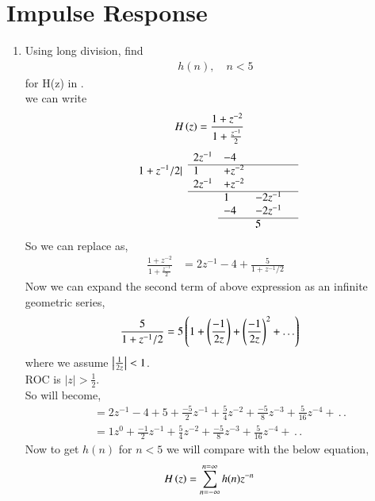 \documentclass[journal,12pt,twocolumn]{IEEEtran}
\renewcommand\thesection{\arabic{section}}
\begin{document}
\section{Impulse Response}
  \begin{enumerate}[label=\thesection.\arabic*]
    \item Using long division, 
find
		\begin{align}
			h(n), \quad n < 5
		\end{align}
		for H(z) in 
		.\\
    \solution  we can write
	  \begin{align}
		H\left(z\right) &= \frac{1 + z^{-2}}{1 + \frac{z^{-1}}{2}}
	  \end{align}
    $$
\begin{array}{llllll}
& 2z^{-1} & -4 \\\cline{2-5}
1 + z^{-1}/2 | & 1& +z^{-2}  \\
& 2z^{-1} & +z^{-2}  \\\cline{2-5}
& & 1 & -2z^{-1} \\
& & -4 & -2z^{-1} & \\\cline{3-5}
& & & 5 \\
\end{array}
$$
So we can replace as, 
   \begin{align}
     \frac{1+z^{-2}}{1 + \frac{z^{-1}}{2}} &= 2z^{-1} - 4 + \frac{5}{1 + z^{-1}/2}\label{eq:longdiv}
   \end{align}
   Now we can expand the second term of above expression as an infinite geometric series,
   \begin{align}
     \frac{5}{1+z^{-1}/2} &= 5\left(1 + \left(\frac{-1}{2z}\right) + \left(\frac{-1}{2z}\right)^2 + .\,.\,.\right) 
    \end{align}
     where we assume $\left\vert\frac{1}{2z}\right\vert < 1$.\\
ROC is $|z|>\frac{1}{2}$.\\
    So  will become,
    \begin{align}
      &= 2z^{-1} - 4 + 5 + \frac{-5}{2}z^{-1} + \frac{5}{4}z^{-2} + \frac{-5}{8}z^{-3} + \frac{5}{16}z^{-4} + \,.\,.\\
      &= 1z^{0} + \frac{-1}{2}z^{-1} +\frac{5}{4}z^{-2} + \frac{-5}{8}z^{-3} +\frac{5}{16}z^{-4} + \,.\,.  \label{eq:longdiv_exp}
    \end{align}
   Now to get $h(n)$ for $n <5$ we will compare with the below equation,
    \begin{align}
      H\left(z\right) &= \sum_{n = -\infty}^{n = \infty}h(n)z^{-n}
    \end{align}

\end{enumerate}
\end{document}
